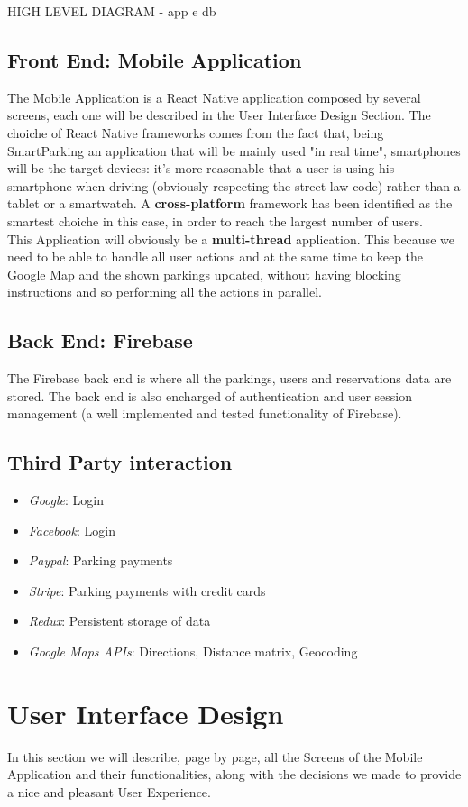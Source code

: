 \documentclass[11pt]{article} %
\begin{document}
HIGH LEVEL DIAGRAM - app e db

\subsection{Front End: Mobile Application}
The Mobile Application is a React Native application composed by several screens, each one will be described in the User Interface Design Section. The choiche of React Native frameworks comes from the fact that, being SmartParking an application that will be mainly used "in real time", smartphones will be the target devices: it's more reasonable that a user is using his smartphone when driving (obviously respecting the street law code) rather than a tablet or a smartwatch. A \textbf{cross-platform} framework has been identified as the smartest choiche in this case, in order to reach the largest number of users.\\
This Application will obviously be a \textbf{multi-thread} application. This because we need to be able to handle all user actions and at the same time to keep the Google Map and the shown parkings updated, without having blocking instructions and so performing all the actions in parallel.  

\subsection{Back End: Firebase}
The Firebase back end is where all the parkings, users and reservations data are stored. The back end is also encharged of authentication and user session management (a well implemented and tested functionality of Firebase). 

\subsection{Third Party interaction}
\begin{itemize}
\item \textit{Google}: Login
\item \textit{Facebook}: Login
\item \textit{Paypal}: Parking payments
\item \textit{Stripe}: Parking payments with credit cards
\item \textit{Redux}: Persistent storage of data
\item \textit{Google Maps APIs}: Directions, Distance matrix, Geocoding
\end{itemize}

\section{User Interface Design}
In this section we will describe, page by page, all the Screens of the Mobile Application and their functionalities, along with the decisions we made to provide a nice and pleasant User Experience.
\end{document}
